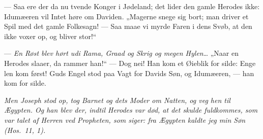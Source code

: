 \documentclass[12pt,a4paper]{book}
\begin{document}
--- Saa ere der da nu tvende Konger i Jødeland; det lider den gamle Herodes ikke:
Idumæeren vil Intet høre om Daviden. „Magerne snege sig bort; man driver et Spil
med det gamle Folkesagn! --- Saa maae vi myrde Faren i dens Svøb, at den ikke
voxer op, og bliver stor!“

--- \emph{En Røst blev hørt udi Rama, Graad og Skrig og megen Hylen}\ldots{}
„Naar en Herodes slaaer, da rammer han!“ --- Dog nei! Han kom et Øieblik for
silde: Enge\-%
len kom først! Guds Engel stod paa Vagt for Davids Søn, og Idumæeren, --- han kom
for silde.

\emph{Men Joseph stod op, tog Barnet og dets Moder om Natten, og veg hen til
Ægypten. Og han blev der, indtil Herodes var død, at det skulde fuldkommes, som
var talet af Herren ved Propheten, som siger: fra Ægypten kaldte jeg min Søn
(Hos.\ 11, 1).}
\end{document}
